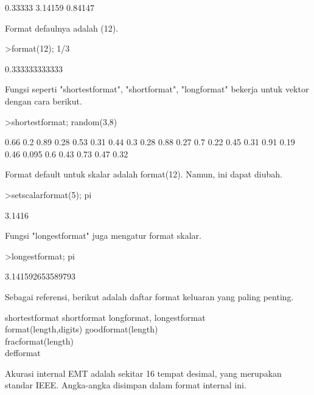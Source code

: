 \documentclass[a4paper,10pt]{article}
\begin{document}
\begin{eulernotebook}
\begin{euleroutput}
      0.33333 
      3.14159 
      0.84147 
\end{euleroutput}
\begin{eulercomment}
Format defaulnya adalah (12).
\end{eulercomment}
\begin{eulerprompt}
>format(12); 1/3
\end{eulerprompt}
\begin{euleroutput}
  0.333333333333
\end{euleroutput}
\begin{eulercomment}
Fungsi seperti "shortestformat", "shortformat", "longformat" bekerja
untuk vektor dengan cara berikut.
\end{eulercomment}
\begin{eulerprompt}
>shortestformat; random(3,8)
\end{eulerprompt}
\begin{euleroutput}
    0.66    0.2   0.89   0.28   0.53   0.31   0.44    0.3 
    0.28   0.88   0.27    0.7   0.22   0.45   0.31   0.91 
    0.19   0.46  0.095    0.6   0.43   0.73   0.47   0.32 
\end{euleroutput}
\begin{eulercomment}
Format default untuk skalar adalah format(12). Namun, ini dapat
diubah.
\end{eulercomment}
\begin{eulerprompt}
>setscalarformat(5); pi
\end{eulerprompt}
\begin{euleroutput}
  3.1416
\end{euleroutput}
\begin{eulercomment}
Fungsi "longestformat" juga mengatur format skalar.
\end{eulercomment}
\begin{eulerprompt}
>longestformat; pi
\end{eulerprompt}
\begin{euleroutput}
  3.141592653589793
\end{euleroutput}
\begin{eulercomment}
Sebagai referensi, berikut adalah daftar format keluaran yang paling
penting.

shortestformat  shortformat longformat, longestformat \\
format(length,digits) goodformat(length)\\
fracformat(length)\\
defformat 

Akurasi internal EMT adalah sekitar 16 tempat desimal, yang merupakan
standar IEEE. Angka-angka disimpan dalam format internal ini.


\end{eulercomment}
\end{eulernotebook}
\end{document}
